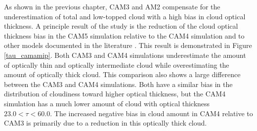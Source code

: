 As shown in the previous chapter, CAM3 and AM2 compensate for the underestimation of total and low-topped cloud with a high bias in cloud optical thickness. A principle result of the \cite{kay_et_al_2011} study is the reduction of the cloud optical thickness bias in the CAM5 simulation relative to the CAM4 simulation and to other models documented in the literature \citep[e.g.,][]{zhang_et_al_2005}. This result is demonstrated in Figure \ref{tau_camamip}. Both CAM3 and CAM4 simulations underestimate the amount of optically thin and optically intermediate cloud while overestimating the amount of optically thick cloud. This comparison also shows a large difference between the CAM3 and CAM4 simulations. Both have a similar bias in the distribution of cloudiness toward higher optical thickness, but the CAM4 simulation has a much lower amount of cloud with optical thickness $23.0 < \tau < 60.0$. The increased negative bias in cloud amount in CAM4 relative to CAM3 is primarily due to a reduction in this optically thick cloud.


